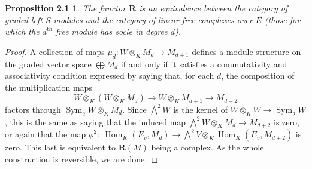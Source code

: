\documentclass{tran-l}
\newcommand{\myHom}{\operatorname{Hom}}
\newcommand{\Sym}{\operatorname{Sym}}
\newcommand{\myth}{{\operatorname{th}}}
\newcommand{\RR}{\mathbf{R}}
\theoremstyle{plain}
\newtheorem*{theorem3}{Proposition 2.1}
\theoremstyle{remark}
\theoremstyle{definition}
\begin{document}
\begin{theorem3}
The functor $\RR $
is an equivalence between the category of graded left $S$-modules
and the category of linear free complexes over $E$ (those
for which the $d^{\myth }$ free module has socle in degree $d$).
\end{theorem3}
\begin{proof}  A collection of maps $\mu _{d}: W\otimes _{K} M_{d}\to M_{d+1}$
defines a module structure on the graded
vector space $\bigoplus M_{d}$ if and only if it satisfies
a commutativity and associativity condition
expressed by saying that,
for each $d$, the composition of the multiplication maps
\begin{equation*}W\otimes _{K} (W\otimes _{K} M_{d})\to W\otimes _{K} M_{d+1}
\to M_{d+2}
\end{equation*}
factors through $\Sym _{2}W \otimes _{K} M_{d}$. Since $\bigwedge ^{2} W$
is the kernel of $W\otimes _{K} W\to \Sym _{2} W$, this is the same
as saying that the induced map $\bigwedge ^{2} W\otimes _{K} M_{d}\to M_{d+2}$
is zero, or again that the map
$\phi ^{2}:\ \myHom _{K}(E_{v},M_{d})\to \bigwedge ^{2} V\otimes _{K} \myHom _{K}(E_{v},M_{d+2})$
is zero.
This last is equivalent to $\RR (M)$ being a complex.
As the whole construction is reversible, we are done.
\end{proof}
\end{document}
